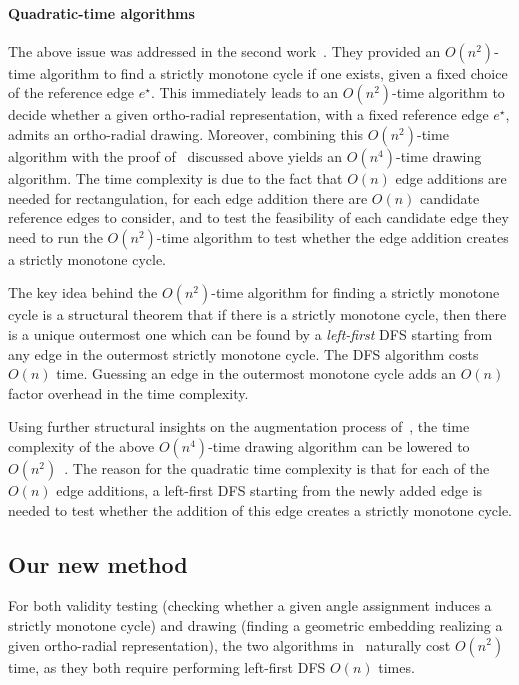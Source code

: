 \documentclass{theoretics}
\newcommand{\eref}{e^\star}
\begin{document}
\paragraph{Quadratic-time algorithms}
The above issue was addressed in the second work~\cite{niedermann19}. They provided an $O(n^2)$-time algorithm to find a strictly monotone cycle if one exists, given a fixed choice of the reference edge $\eref$. This immediately leads to an $O(n^2)$-time algorithm to decide whether a given ortho-radial representation, with a fixed reference edge $\eref$, admits an ortho-radial drawing. Moreover, combining this $O(n^2)$-time algorithm with the proof of~\cite{barth2017} discussed above yields an $O(n^4)$-time drawing algorithm. The time complexity is due to the fact that $O(n)$ edge additions are needed for rectangulation, for each edge addition there are $O(n)$ candidate reference edges to consider, and to test the feasibility of each candidate edge they need to run the  $O(n^2)$-time algorithm to test whether the edge addition creates a strictly monotone cycle.

The key idea behind the $O(n^2)$-time algorithm for finding a strictly monotone cycle is a structural theorem that if there is a strictly monotone cycle, then there is a unique outermost one which can be found by a \emph{left-first} DFS starting from any edge in the outermost strictly monotone cycle. The DFS algorithm costs $O(n)$ time. Guessing an edge in the outermost monotone cycle adds an $O(n)$ factor overhead in the time complexity.

Using further structural insights on the augmentation process of~\cite{barth2017}, the time complexity of the above $O(n^4)$-time drawing algorithm can be lowered to $O(n^2)$~\cite{niedermann19}. The reason for the quadratic time complexity is that for each of the $O(n)$ edge additions, a left-first DFS starting from the newly added edge is needed to test whether the addition of this edge creates a strictly monotone cycle. 


\subsection{Our new method}

For both validity testing (checking whether a given angle assignment induces a strictly monotone cycle) and drawing (finding a geometric embedding realizing a given ortho-radial representation), the two algorithms in~\cite{barth2023topology} naturally cost $O(n^2)$ time, as they both require performing left-first DFS  $O(n)$ times.
\end{document}
